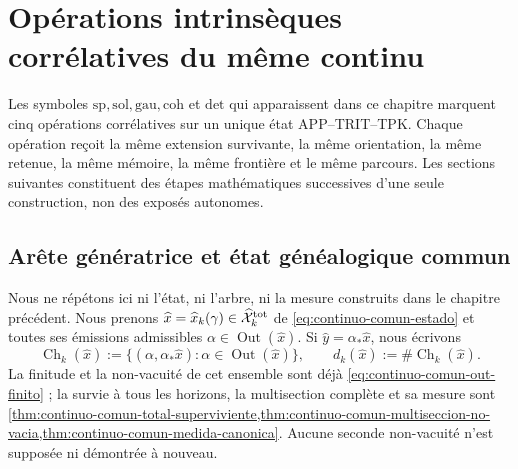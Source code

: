 \chapter{Opérations intrinsèques corrélatives du même continu}
\label{chap:pdfv2-operaciones-intrinsecas-correlativas}

\begin{thesisbox}
Les symboles \(\mathrm{sp},\mathrm{sol},\mathrm{gau},\mathrm{coh}\) et \(\mathrm{det}\) qui apparaissent dans ce chapitre marquent cinq opérations corrélatives sur un unique état APP--TRIT--TPK\@. Chaque opération reçoit la même extension survivante, la même orientation, la même retenue, la même mémoire, la même frontière et le même parcours. Les sections suivantes constituent des étapes mathématiques successives d'une seule construction, non des exposés autonomes.
\end{thesisbox}

\section{Arête génératrice et état généalogique commun}

Nous ne répétons ici ni l'état, ni l'arbre, ni la mesure construits dans le chapitre précédent. Nous prenons \(\widehat x=\widehat x_k(\gamma)\in
\widehat{\mathcal X}^{\rm tot}_k\) de \eqref{eq:continuo-comun-estado} et toutes ses émissions admissibles \(\alpha\in\operatorname{Out}(\widehat x)\). Si \(\widehat y=\alpha_*\widehat x\), nous écrivons
\begin{equation}
\label{eq:pdfv2-cor-hijos-supervivientes}
 \operatorname{Ch}_k(\widehat x):=
 \{(\alpha,\alpha_*\widehat x):
      \alpha\in\operatorname{Out}(\widehat x)\},
 \qquad
 d_k(\widehat x):=\#\operatorname{Ch}_k(\widehat x).
\end{equation}
La finitude et la non-vacuité de cet ensemble sont déjà \eqref{eq:continuo-comun-out-finito} ; la survie à tous les horizons, la multisection complète et sa mesure sont \cref{thm:continuo-comun-total-superviviente,thm:continuo-comun-multiseccion-no-vacia,thm:continuo-comun-medida-canonica}. Aucune seconde non-vacuité n'est supposée ni démontrée à nouveau.

